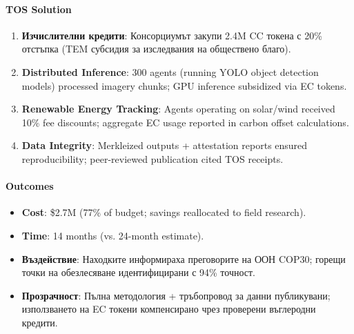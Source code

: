 \documentclass[11pt]{article}
\begin{document}
\paragraph{TOS Solution}
\begin{enumerate}[noitemsep]
  \item \textbf{Изчислителни кредити}: Консорциумът закупи 2.4M CC токена с 20\% отстъпка (TEM субсидия за изследвания на обществено благо).
  \item \textbf{Distributed Inference}: 300 agents (running YOLO object detection models) processed imagery chunks; GPU inference subsidized via EC tokens.
  \item \textbf{Renewable Energy Tracking}: Agents operating on solar/wind received 10\% fee discounts; aggregate EC usage reported in carbon offset calculations.
  \item \textbf{Data Integrity}: Merkleized outputs + attestation reports ensured reproducibility; peer-reviewed publication cited TOS receipts.
\end{enumerate}

\paragraph{Outcomes}
\begin{itemize}[noitemsep]
  \item \textbf{Cost}: \$2.7M (77\% of budget; savings reallocated to field research).
  \item \textbf{Time}: 14 months (vs. 24-month estimate).
  \item \textbf{Въздействие}: Находките информираха преговорите на ООН COP30; горещи точки на обезлесяване идентифицирани с 94\% точност.
  \item \textbf{Прозрачност}: Пълна методология + тръбопровод за данни публикувани; използването на EC токени компенсирано чрез проверени въглеродни кредити.
\end{itemize}
\end{document}
